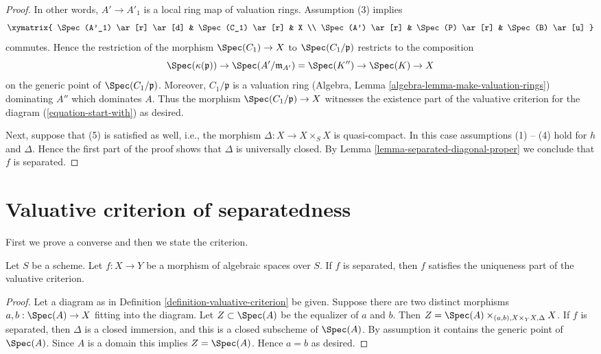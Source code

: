 \begin{proof}
In other words, $A' \to A'_1$ is a local ring map of valuation
rings. Assumption (3) implies
$$
\xymatrix{
\Spec(A'_1) \ar[r] \ar[d] & \Spec(C_1) \ar[r] & X \\
\Spec(A') \ar[r] & \Spec(P) \ar[r] & \Spec(B) \ar[u]
}
$$
commutes. Hence the restriction of the morphism $\Spec(C_1) \to X$
to $\Spec(C_1/\mathfrak p)$ restricts to the composition
$$
\Spec(\kappa(\mathfrak p)) \to
\Spec(A'/\mathfrak m_{A'}) = \Spec(K'') \to
\Spec(K) \to X
$$
on the generic point of $\Spec(C_1/\mathfrak p)$. Moreover,
$C_1/\mathfrak p$ is a valuation ring
(Algebra, Lemma \ref{algebra-lemma-make-valuation-rings})
dominating $A''$ which dominates $A$.
Thus the morphism $\Spec(C_1/\mathfrak p) \to X$ witnesses the
existence part of the valuative criterion for the diagram
(\ref{equation-start-with}) as desired.

\medskip\noindent
Next, suppose that (5) is satisfied as well, i.e., the morphism
$\Delta : X \to X \times_S X$ is quasi-compact. In this case
assumptions (1) -- (4) hold for $h$ and $\Delta$. Hence the first
part of the proof shows that $\Delta$ is universally closed.
By Lemma \ref{lemma-separated-diagonal-proper} we conclude that
$f$ is separated.
\end{proof}

















\section{Valuative criterion of separatedness}
\label{section-valuative-separatedness}

\noindent
First we prove a converse and then we state the criterion.

\begin{lemma}
\label{lemma-separated-implies-valuative}
Let $S$ be a scheme.
Let $f : X \to Y$ be a morphism of algebraic spaces over $S$.
If $f$ is separated, then $f$ satisfies the uniqueness
part of the valuative criterion.
\end{lemma}

\begin{proof}
Let a diagram as in Definition \ref{definition-valuative-criterion}
be given. Suppose there are two distinct morphisms
$a, b : \Spec(A) \to X$ fitting into the diagram.
Let $Z \subset \Spec(A)$ be the equalizer of $a$ and $b$.
Then $Z = \Spec(A) \times_{(a, b), X \times_Y X, \Delta} X$.
If $f$ is separated, then $\Delta$ is a closed immersion, and
this is a closed subscheme of $\Spec(A)$. By assumption it contains
the generic point of $\Spec(A)$. Since $A$ is a domain
this implies $Z = \Spec(A)$. Hence $a = b$ as desired.
\end{proof}

